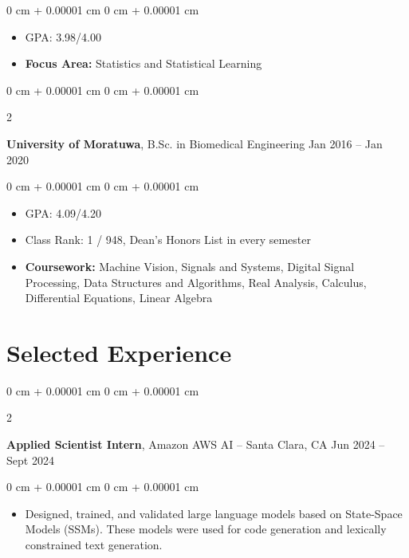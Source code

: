 \documentclass[10pt, letterpaper]{article}
\newenvironment{highlights}{
    \begin{itemize}[
        topsep=0.10 cm,
        parsep=0.10 cm,
        partopsep=0pt,
        itemsep=0pt,
        leftmargin=0 cm + 10pt
    ]
}{
    \end{itemize}
} %
\newenvironment{onecolentry}{
    \begin{adjustwidth}{
        0 cm + 0.00001 cm
    }{
        0 cm + 0.00001 cm
    }
}{
    \end{adjustwidth}
} %
\newenvironment{twocolentry}[2][]{
    \onecolentry
    \def\secondColumn{#2}
    \setcolumnwidth{\fill, 4.5 cm}
    \begin{paracol}{2}
}{
    \switchcolumn \raggedleft \secondColumn
    \end{paracol}
    \endonecolentry
} %
\begin{document}
        \vspace{0.10 cm}
        \begin{onecolentry}
            \begin{highlights}
                \item GPA: 3.98/4.00
                \item \textbf{Focus Area:} Statistics and Statistical Learning
            \end{highlights}
        \end{onecolentry}

        \vspace{0.20 cm}
        
        \begin{twocolentry}{
            Jan 2016 – Jan 2020
        }
            \textbf{University of Moratuwa}, B.Sc. in Biomedical Engineering \end{twocolentry}

        \vspace{0.10 cm}
        \begin{onecolentry}
            \begin{highlights}
                \item GPA: 4.09/4.20
                \item Class Rank: 1 / 948, Dean's Honors List in every semester
                \item \textbf{Coursework:} Machine Vision, Signals and Systems, Digital Signal Processing, Data Structures and Algorithms, Real Analysis, Calculus, Differential Equations, Linear Algebra
            \end{highlights}
        \end{onecolentry}



    
    \section{Selected Experience}



        
        \begin{twocolentry}{
            Jun 2024 – Sept 2024
        }
            \textbf{Applied Scientist Intern}, Amazon AWS AI -- Santa Clara, CA\end{twocolentry}

        \vspace{0.10 cm}
        \begin{onecolentry}
            \begin{highlights}
                \item Designed, trained, and validated large language models based on State-Space Models (SSMs). These models were used for code generation and lexically constrained text generation.
            \end{highlights}
        \end{onecolentry}
\end{document}
